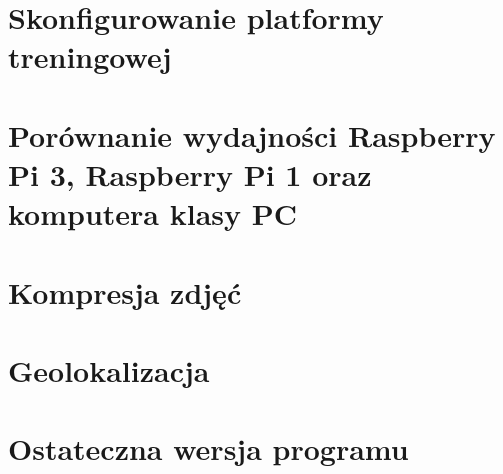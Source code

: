 \documentclass[12pt, a4paper]{report}
\begin{document}
    \chapter{Skonfigurowanie platformy treningowej}\label{ch:cover}
    

    \chapter{Porównanie wydajności Raspberry Pi 3, Raspberry Pi 1 oraz komputera klasy PC}\label{ch:performance}
    

    \chapter{Kompresja zdjęć}\label{ch:compression}
    

    \chapter{Geolokalizacja}\label{ch:geolocalisation}
    

    \chapter{Ostateczna wersja programu}\label{ch:final}
    
\end{document}
